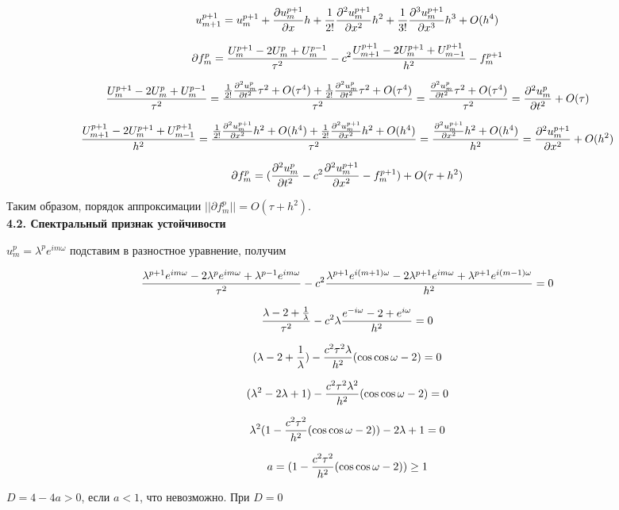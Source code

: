 \documentclass[a4paper]{article}
\begin{document}
$$u_{m+1}^{p+1}=u_m^{p+1} + {\partial{u_m^{p+1}} \over \partial{x}}h + {1 \over 2!}{\partial^2{u_m^{p+1}} \over \partial{x^2}}h^2 + {1 \over 3!}{\partial^3{u_m^{p+1}} \over \partial{x^3}}h^3 + O(h^4)$$

$$\partial{f_m^p} = {U_m^{p+1}-2U_m^p+U_m^{p-1} \over \tau^2} - c^2{U_{m+1}^{p+1}-2U_m^{p+1}+U_{m-1}^{p+1} \over h^2} - f_m^{p+1}$$

$${U_m^{p+1}-2U_m^p+U_m^{p-1} \over \tau^2} = {{1 \over 2!}{\partial^2{u_m^p} \over \partial{t^2}}\tau^2 + O(\tau^4) + {1 \over 2!}{\partial^2{u_m^p} \over \partial{t^2}}\tau^2 + O(\tau^4) \over \tau^2} = {{\partial^2{u_m^p} \over \partial{t^2}}\tau^2 + O(\tau^4) \over \tau^2} = {\partial^2{u_m^p} \over \partial{t^2}} + O(\tau) $$

$${U_{m+1}^{p+1}-2U_m^{p+1}+U_{m-1}^{p+1} \over h^2} = {{1 \over 2!}{\partial^2{u_m^{p+1}} \over \partial{x^2}}h^2 + O(h^4) + {1 \over 2!}{\partial^2{u_m^{p+1}} \over \partial{x^2}}h^2 + O(h^4) \over \tau^2} = {{\partial^2{u_m^{p+1}} \over \partial{x^2}}h^2 + O(h^4) \over h^2} = {\partial^2{u_m^{p+1}} \over \partial{x^2}} + O(h^2)$$

$$\partial{f_m^p} = ({\partial^2{u_m^p}\over \partial{t^2}} - c^2{\partial^2{u_m^{p+1}} \over \partial{x^2}} - f_m^{p+1}) + O(\tau + h^2)$$

Таким образом, порядок аппроксимации $||\partial{f_m^p}||=O(\tau+h^2)$. \\
\textbf{4.2. Спектральный признак устойчивости}

$u_m^p=\lambda^pe^{im\omega}$ подставим в разностное уравнение, получим

$${\lambda^{p+1}e^{im\omega}-2\lambda^pe^{im\omega}+\lambda^{p-1}e^{im\omega} \over \tau^2} - c^2{\lambda^{p+1}e^{i(m+1)\omega}-2\lambda^{p+1}e^{im\omega}+\lambda^{p+1}e^{i(m-1)\omega} \over h^2} = 0$$

$${\lambda-2+{1\over\lambda} \over \tau^2} - c^2\lambda{e^{-i\omega}-2+e^{i\omega} \over h^2} = 0$$

$$(\lambda-2+{1\over\lambda}) - {c^2\tau^2\lambda \over h^2}(\cos{\cos{\omega}}-2) = 0 $$

$$(\lambda^2-2\lambda+1) - {c^2\tau^2\lambda^2 \over h^2}(\cos{\cos{\omega}}-2) = 0 $$

$$\lambda^2(1-{c^2\tau^2 \over h^2}(\cos{\cos{\omega}}-2)) - 2\lambda + 1 = 0$$

$$a = (1-{c^2\tau^2 \over h^2}(\cos{\cos{\omega}}-2)) \geq 1$$

$D=4-4a>0$, если $a<1$, что невозможно. При $D=0$
\end{document}
